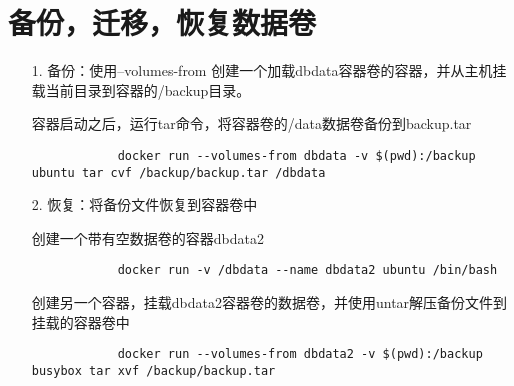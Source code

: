 \documentclass[a4paper,left=1.5cm,right=1.5cm,11pt]{article}
\begin{document}
\section{备份，迁移，恢复数据卷}
\begin{itemize}
	\item[1.]备份：使用--volumes-from 创建一个加载dbdata容器卷的容器，并从主机挂载当前目录到容器的/backup目录。\par
		容器启动之后，运行tar命令，将容器卷的/data数据卷备份到backup.tar
		\begin{lstlisting}
			docker run --volumes-from dbdata -v $(pwd):/backup ubuntu tar cvf /backup/backup.tar /dbdata
		\end{lstlisting}
	\item[2.]恢复：将备份文件恢复到容器卷中\par
		创建一个带有空数据卷的容器dbdata2\par
		\begin{lstlisting}
			docker run -v /dbdata --name dbdata2 ubuntu /bin/bash
		\end{lstlisting}
		创建另一个容器，挂载dbdata2容器卷的数据卷，并使用untar解压备份文件到挂载的容器卷中
		\begin{lstlisting}
			docker run --volumes-from dbdata2 -v $(pwd):/backup busybox tar xvf /backup/backup.tar
		\end{lstlisting}
\end{itemize}
\end{document}
